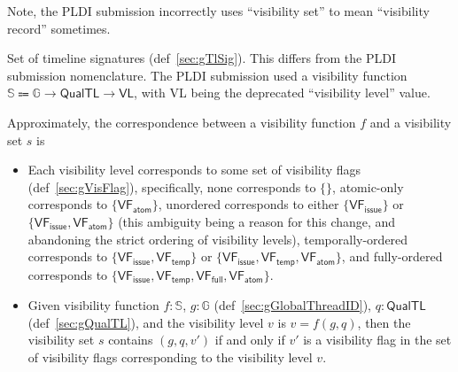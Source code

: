 
Note, the PLDI submission incorrectly uses ``visibility set'' to mean ``visibility record'' sometimes.

Set of timeline signatures (def~\ref{sec:gTlSig}).
This differs from the PLDI submission nomenclature.
The PLDI submission used a visibility function $\mathbb{S} \Coloneqq \mathbb{G} \to \mathsf{QualTL} \to \mathsf{VL}$, with \textsf{VL} being the deprecated ``visibility level'' value.

Approximately, the correspondence between a visibility function $f$ and a visibility set $s$ is
\begin{itemize}
  \item Each visibility level corresponds to some set of visibility flags (def~\ref{sec:gVisFlag}), specifically, none corresponds to $\{\}$, atomic-only corresponds to $\{\mathsf{VF_{atom}}\}$, unordered corresponds to either $\{\mathsf{VF_{issue}}\}$ or $\{\mathsf{VF_{issue}}, \mathsf{VF_{atom}}\}$ (this ambiguity being a reason for this change, and abandoning the strict ordering of visibility levels), temporally-ordered corresponds to $\{\mathsf{VF_{issue}}, \mathsf{VF_{temp}}\}$ or $\{\mathsf{VF_{issue}}, \mathsf{VF_{temp}}, \mathsf{VF_{atom}}\}$, and fully-ordered corresponds to $\{\mathsf{VF_{issue}}, \mathsf{VF_{temp}}, \mathsf{VF_{full}}, \mathsf{VF_{atom}}\}$.
  \item Given visibility function $f: \mathbb{S}$, $g: \mathbb{G}$ (def~\ref{sec:gGlobalThreadID}), $q: \mathsf{QualTL}$ (def~\ref{sec:gQualTL}), and the visibility level $v$ is $v = f(g, q)$, then the visibility set $s$ contains $(g, q, v')$ if and only if $v'$ is a visibility flag in the set of visibility flags corresponding to the visibility level $v$.
\end{itemize}


